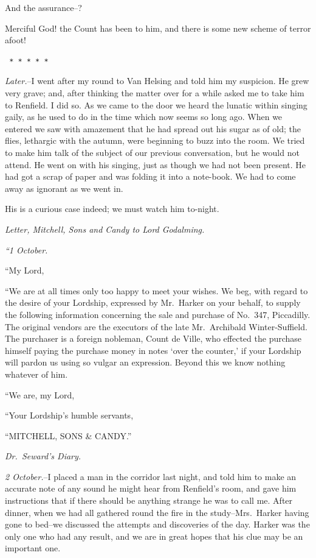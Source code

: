 \documentclass[12pt,openright]{book}
\begin{document}
And the assurance–?

Merciful God! the Count has been to him, and there is some new scheme of terror afoot!

\texttt{   *       *       *       *       *}

\textit{Later.}–I went after my round to Van Helsing and told him my suspicion. He grew very grave; and, after thinking the matter over for a while asked me to take him to Renfield. I did so. As we came to the door we heard the lunatic within singing gaily, as he used to do in the time which now seems so long ago. When we entered we saw with amazement that he had spread out his sugar as of old; the flies, lethargic with the autumn, were beginning to buzz into the room. We tried to make him talk of the subject of our previous conversation, but he would not attend. He went on with his singing, just as though we had not been present. He had got a scrap of paper and was folding it into a note-book. We had to come away as ignorant as we went in.

His is a curious case indeed; we must watch him to-night.

\textit{Letter, Mitchell, Sons and Candy to Lord Godalming.}

\textit{“1 October.}

“My Lord,

“We are at all times only too happy to meet your wishes. We beg, with regard to the desire of your Lordship, expressed by Mr. Harker on your behalf, to supply the following information concerning the sale and purchase of No. 347, Piccadilly. The original vendors are the executors of the late Mr. Archibald Winter-Suffield. The purchaser is a foreign nobleman, Count de Ville, who effected the purchase himself paying the purchase money in notes ‘over the counter,’ if your Lordship will pardon us using so vulgar an expression. Beyond this we know nothing whatever of him.

“We are, my Lord,

“Your Lordship’s humble servants,

“MITCHELL, SONS \& CANDY.”

\textit{Dr. Seward’s Diary.}

\textit{2 October.}–I placed a man in the corridor last night, and told him to make an accurate note of any sound he might hear from Renfield’s room, and gave him instructions that if there should be anything strange he was to call me. After dinner, when we had all gathered round the fire in the study–Mrs. Harker having gone to bed–we discussed the attempts and discoveries of the day. Harker was the only one who had any result, and we are in great hopes that his clue may be an important one.
\end{document}

